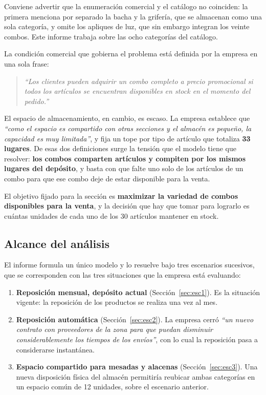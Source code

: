 \documentclass[10pt,a4paper]{article}
\newcommand{\cita}[1]{\emph{``#1''}}
\begin{document}
Conviene advertir que la enumeración comercial y el catálogo no coinciden: la
primera menciona por separado la bacha y la grifería, que se almacenan como una
sola categoría, y omite los apliques de luz, que sin embargo integran los veinte
combos. Este informe trabaja sobre las ocho categorías del catálogo.

La condición comercial que gobierna el problema está definida por la empresa en
una sola frase:

\begin{quote}
\cita{Los clientes pueden adquirir un combo completo a precio promocional si
todos los artículos se encuentran disponibles en stock en el momento del
pedido.}
\end{quote}

El espacio de almacenamiento, en cambio, es escaso. La empresa establece que
\cita{como el espacio es compartido con otras secciones y el almacén es pequeño,
la capacidad es muy limitada}, y fija un tope por tipo de artículo que totaliza
\textbf{33 lugares}. De esas dos definiciones surge la tensión que el modelo
tiene que resolver: \textbf{los combos comparten artículos y compiten por los
mismos lugares del depósito}, y basta con que falte uno solo de los artículos de
un combo para que ese combo deje de estar disponible para la venta.

El objetivo fijado para la sección es \textbf{maximizar la variedad de combos
disponibles para la venta}, y la decisión que hay que tomar para lograrlo es
cuántas unidades de cada uno de los 30 artículos mantener en stock.

\subsection{Alcance del análisis}

El informe formula un único modelo y lo resuelve bajo tres escenarios
sucesivos, que se corresponden con las tres situaciones que la empresa está
evaluando:

\begin{enumerate}
  \item \textbf{Reposición mensual, depósito actual} (Sección~\ref{sec:esc1}).
  Es la situación vigente: la reposición de los productos se realiza una vez al
  mes.
  \item \textbf{Reposición automática} (Sección~\ref{sec:esc2}). La empresa
  cerró \cita{un nuevo contrato con proveedores de la zona para que puedan
  disminuir considerablemente los tiempos de los envíos}, con lo cual la
  reposición pasa a considerarse instantánea.
  \item \textbf{Espacio compartido para mesadas y alacenas}
  (Sección~\ref{sec:esc3}). Una nueva disposición física del almacén permitiría
  reubicar ambas categorías en un espacio común de 12 unidades, sobre el
  escenario anterior.
\end{enumerate}
\end{document}
